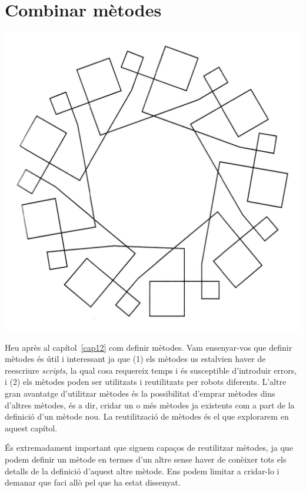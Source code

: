 \chapter{Combinar mètodes}
\label{cap13}

\includegraphics[scale=0.10]{Imatges/figura13-0.jpg}

Heu après al capítol~\ref{cap12} com definir mètodes. Vam ensenyar-vos que definir mètodes és útil i interessant ja que (1) els mètodes us estalvien haver de reescriure \emph{scripts}, la qual cosa requereix temps i és susceptible d'introduir errors, i (2) els mètodes poden ser utilitzats i reutilitzats per robots diferents. L'altre gran avantatge d'utilitzar mètodes és la possibilitat d'emprar mètodes dins d'altres mètodes, és a dir, cridar un o més mètodes ja existents com a part de la definició d'un mètode nou. La reutilització de mètodes és el que explorarem en aquest capítol.

És extremadament important que siguem capaços de reutilitzar mètodes, ja que podem definir un mètode en termes d'un altre sense haver de conèixer tots els detalls de la definició d'aquest altre mètode. Ens podem limitar a cridar-lo i demanar que faci allò pel que ha estat dissenyat.

